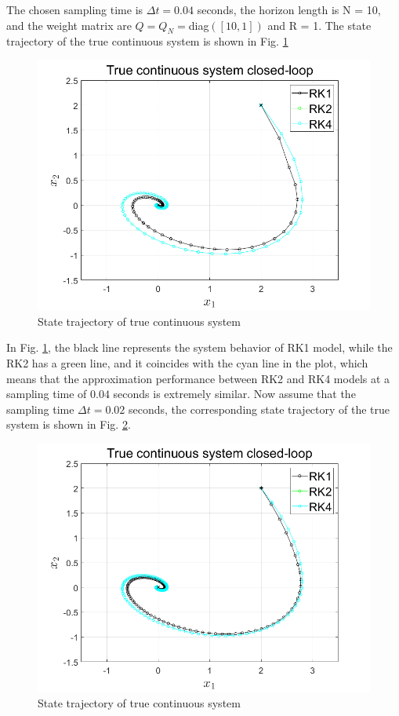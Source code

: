 The chosen sampling time is $\Delta t = 0.04$ seconds, the horizon length is N = 10, and the weight matrix are $Q = Q_N =$diag$([10,1])$ and R = 1.
The state trajectory of the true continuous system is shown in Fig. \ref{fig:statetrajec0.04}
\begin{figure}[h!]
	\centering
	\includegraphics[width=\linewidth]{pics/deltat = 0.04.png}
	\caption{State trajectory of true continuous system}
	\label{fig:statetrajec0.04}
\end{figure}
\newline
In Fig. \ref{fig:statetrajec0.04}, the black line represents the system behavior of RK1 model, while the RK2 has a green line, and it coincides with the cyan line in the plot, which means that the approximation performance between RK2 and RK4 models at a sampling time of $0.04$ seconds is extremely similar.
Now assume that the sampling time $\Delta t = 0.02$ seconds, the corresponding state trajectory of the true system is shown in Fig. \ref{fig:statetrajec0.02}.
\begin{figure}[H]
 	\centering
 	\includegraphics[width=\linewidth]{pics/deltat = 0.02.png}
 	\caption{State trajectory of true continuous system}
 	\label{fig:statetrajec0.02}
\end{figure}

